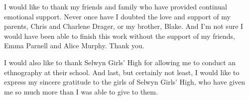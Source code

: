 I would like to thank my friends and family who have provided continual emotional support.  Never once have I doubted the love and support of my parents, Chris and Charlene Drager, or my brother, Blake.  And I'm not sure I would have been able to finish this work without the support of my friends, Emma Parnell and Alice Murphy.  Thank you. 

I would also like to thank Selwyn Girls' High for allowing me to conduct an ethnography at their school.  And last, but certainly not least, I would like to express my sincere gratitude to the girls of Selwyn Girls' High, who have given me so much more than I was able to give to them.